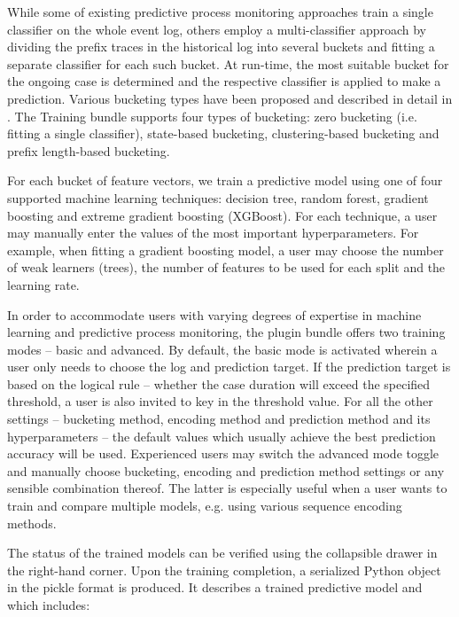 \documentclass[runningheads,a4paper]{llncs}
\begin{document}
While some of existing predictive process monitoring approaches train a single classifier on the whole event log, others employ a multi-classifier approach by dividing the prefix traces in the historical log into several buckets and fitting a separate classifier for each such bucket. At run-time, the most suitable bucket for the ongoing case is determined and the respective classifier is applied to make a prediction. Various bucketing types have been proposed and described in detail in \cite{Teinemaa2017}. The Training bundle supports four types of bucketing: zero bucketing (i.e. fitting a single classifier), state-based bucketing, clustering-based bucketing and prefix length-based bucketing.

For each bucket of feature vectors, we train a predictive model using one of four supported machine learning techniques: decision tree, random forest, gradient boosting and extreme gradient boosting (XGBoost). For each technique, a user may manually enter the values of the most important hyperparameters. For example, when fitting a gradient boosting model, a user may choose the number of weak learners (trees), the number of features to be used for each split and the learning rate.

In order to accommodate users with varying degrees of expertise in machine learning and predictive process monitoring, the plugin bundle offers two training modes -- basic and advanced. By default, the basic mode is activated wherein a user only needs to choose the log and prediction target. If the prediction target is based on the logical rule -- whether the case duration will exceed the specified threshold, a user is also invited to key in the threshold value. For all the other settings -- bucketing method, encoding method and prediction method and its hyperparameters -- the default values which usually achieve the best prediction accuracy will be used. Experienced users may switch the advanced mode toggle and manually choose bucketing, encoding and prediction method settings or any sensible combination thereof. The latter is especially useful when a user wants to train and compare multiple models, e.g. using various sequence encoding methods.

The status of the trained models can be verified using the collapsible drawer in the right-hand corner. Upon the training completion, a serialized Python object in the pickle format is produced. It describes a trained predictive model and which includes:
\end{document}
